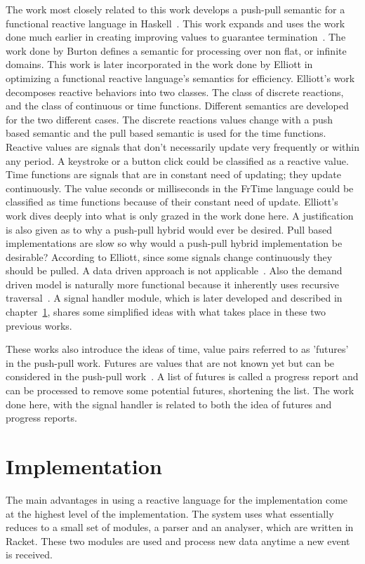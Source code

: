 \documentclass[12pt]{ucthesis}
\begin{document}
The work most closely related to this work develops a push-pull semantic for a functional reactive language in Haskell~\cite{push-pull-frp}. This work expands and uses the work done much earlier in creating improving values to guarantee termination~\cite{historic-paper}. The work done by Burton defines a semantic for processing over non flat, or infinite domains. This work is later incorporated in the work done by Elliott in optimizing a functional reactive language's semantics for efficiency. Elliott's work decomposes reactive behaviors into two classes. The class of discrete reactions, and the class of continuous or time functions. Different semantics are developed for the two different cases. The discrete reactions values change with a push based semantic and the pull based semantic is used for the time functions. Reactive values are signals that don't necessarily update very frequently or within any period. A keystroke or a button click could be classified as a reactive value. Time functions are signals that are in constant need of updating; they update continuously. The value seconds or milliseconds in the FrTime language could be classified as time functions because of their constant need of update. Elliott's work dives deeply into what is only grazed in the work done here. A justification is also given as to why a push-pull hybrid would ever be desired. Pull based implementations are slow so why would a push-pull hybrid implementation be desirable? According to Elliott, since some signals change continuously they should be pulled. A data driven approach is not applicable~\cite{push-pull-frp}. Also the demand driven model is naturally more functional because it inherently uses recursive traversal~\cite{push-pull-frp}. A signal handler module, which is later developed and described in chapter~\ref{Implementation}, shares some simplified ideas with what takes place in these two previous works. 


These works also introduce the ideas of time, value pairs referred to as 'futures' in the push-pull work. Futures are values that are not known yet but can be considered in the push-pull work~\cite{push-pull-frp}. A list of futures is called a progress report and can be processed to remove some potential futures, shortening the list. The work done here, with the signal handler is related to both the idea of futures and progress reports. 

\chapter{Implementation}
\label{Implementation}
The main advantages in using a reactive language for the implementation come at the highest level of the implementation. The system uses what essentially reduces to a small set of modules, a parser and an analyser, which are written in Racket. These two modules are used and process new data anytime a new event is received. 
\end{document}
